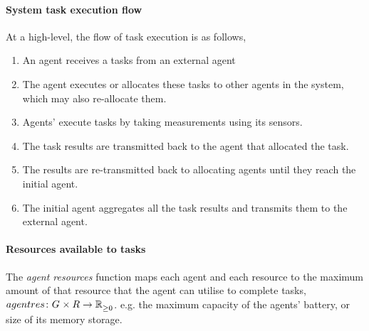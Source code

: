 \paragraph{System task execution flow}

At a high-level, the flow of task execution is as follows,
\begin{enumerate}
	\item An agent receives a tasks from an external agent
	\item The agent executes or allocates these tasks to other agents in the system, which may also re-allocate them.
	\item Agents' execute tasks by taking measurements using its sensors.
	\item The task results are transmitted back to the agent that allocated the task.
	\item The results are re-transmitted back to allocating agents until they reach the initial agent.
	\item The initial agent aggregates all the task results and transmits them to the external agent.
\end{enumerate}

\paragraph{Resources available to tasks}
\newcommand{\functionAgentResourcesSymbol}[2]{
	\functionSymbol{agentres}
}
\newcommand{\formalAgentResources}[2]{
	\functionFormal{\functionAgentResourcesSymbol{}{}}
	{\setAgents{}{} \times \setResource{}{}}
	{\setRealNumbersNonNegative{}{}}
}
\newcommand{\functionAgentResources}[2]{
	\functionSignature{\functionAgentResourcesSymbol{}{}}{\varAgent{}{}, \varResource{}{}}
}
The \textit{agent resources} function maps each agent and each resource to the maximum amount of that resource that the agent can utilise to complete tasks, $\formalAgentResources{}{}$. e.g. the maximum capacity of the agents' battery, or size of its memory storage.

\newcommand{\functionTaskResourceAllocationSymbol}[2]{
	\functionSymbol{taskres}
}
\newcommand{\formalTaskResourceAllocation}[2]{
	\functionFormal{\functionTaskResourceAllocationSymbol{}{}}
	{\setAgents{}{} \times \setAtomicTaskType{}{} \times \setResourceType{}{}}
	{\setRealNumbersNonNegative{}{}}
}
\newcommand{\functionTaskResourceAllocation}[2]{
	\functionSignature{\functionTaskResourceAllocationSymbol{}{}}
	{\varAgent{}{}, \varAtomicTask{}{}, \varResourceType{}{}}
}
\newcommand{\functionTaskResourceAllocationInstance}[2]{
	\functionSignature{\functionTaskResourceAllocationSymbol{}{}}
	{\varAgent{}{}, \varAtomicTask{}{}, \functionResourceType{}{}}
}


